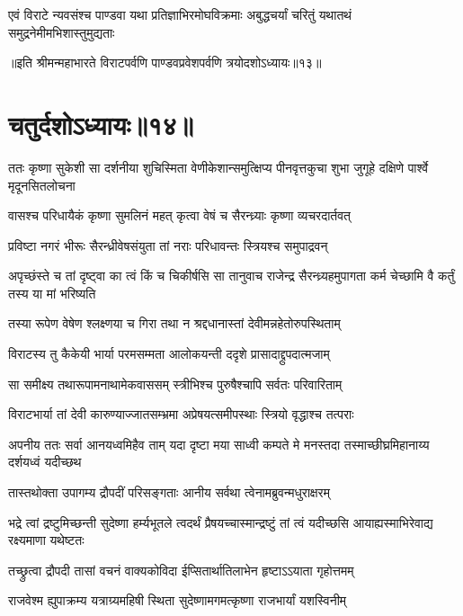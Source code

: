 \fourlineindentedshloka
{एवं विराटे न्यवसंश्च पाण्डवा}
{यथा प्रतिज्ञाभिरमोघविक्रमाः}
{अबुद्धचर्यां चरितुं यथातथं}
{समुद्रनेमीमभिशास्तुमुद्यताः}

॥इति श्रीमन्महाभारते विराटपर्वणि पाण्डवप्रवेशपर्वणि त्रयोदशोऽध्यायः॥१३॥

\chapter{चतुर्दशोऽध्यायः॥१४॥ }

\threelineshloka
{ततः कृष्णा सुकेशी सा दर्शनीया शुचिस्मिता}
{वेणीकेशान्समुत्क्षिप्य पीनवृत्तकुचा शुभा}
{जुगूहे दक्षिणे पार्श्वे मृदूनसितलोचना}


\twolineshloka
{वासश्च परिधायैकं कृष्णा सुमलिनं महत्}
{कृत्वा वेषं च सैरन्ध्र्याः कृष्णा व्यचरदार्तवत्}


\twolineshloka
{प्रविष्टा नगरं भीरूः सैरन्ध्रीवेषसंयुता}
{तां नराः परिधावन्तः स्त्रियश्च समुपाद्रवन्}


\threelineshloka
{अपृच्छंस्ते च तां दृष्ट्वा का त्वं किं च चिकीर्षसि}
{सा तानुवाच राजेन्द्र सैरन्ध्र्यहमुपागता}
{कर्म चेच्छामि वै कर्तुं तस्य या मां भरिष्यति}



\twolineshloka
{तस्या रूपेण वेषेण श्लक्ष्णया च गिरा तथा}
{न श्रद्दधानास्तां देवीमन्नहेतोरुपस्थिताम्}


\twolineshloka
{विराटस्य तु कैकेयी भार्या परमसम्मता}
{आलोकयन्ती ददृशे प्रासादाद्द्रुपदात्मजाम्}


\twolineshloka
{सा समीक्ष्य तथारूपामनाथामेकवाससम्}
{स्त्रीभिश्च पुरुषैश्चापि सर्वतः परिवारिताम्}


\twolineshloka
{विराटभार्या तां देवी कारुण्याज्जातसम्भ्रमा}
{अप्रेषयत्समीपस्थाः स्त्रियो वृद्धाश्च तत्पराः}


\threelineshloka
{अपनीय ततः सर्वा आनयध्वमिहैव ताम्}
{यदा दृष्टा मया साध्वी कम्पते मे मनस्तदा}
{तस्माच्छीघ्रमिहानाय्य दर्शयध्वं यदीच्छथ}


\twolineshloka
{तास्तथोक्ता उपागम्य द्रौपदीं परिसङ्गताः}
{आनीय सर्वथा त्वेनामब्रुवन्मधुराक्षरम्}


\threelineshloka
{भद्रे त्वां द्रष्टुमिच्छन्ती सुदेष्णा हर्म्यभूतले}
{त्वदर्थं प्रैषयच्चास्मान्द्रष्टुं तां त्वं यदीच्छसि}
{आयाह्यस्माभिरेवाद्य रक्ष्यमाणा यथेष्टतः}


\twolineshloka
{तच्छ्रुत्वा द्रौपदी तासां वचनं वाक्यकोविदा}
{ईप्सितार्थातिलाभेन हृष्टाऽऽयाता गृहोत्तमम्}


\twolineshloka
{राजवेश्म ह्युपाक्रम्य यत्राग्र्यमहिषी स्थिता}
{सुदेष्णामगमत्कृष्णा राजभार्यां यशस्विनीम्}


